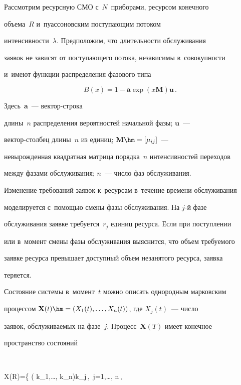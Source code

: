   


  Рассмотрим ресурсную СМО с~$N$~приборами, ресурсом конечного 


объема~$R$ и~пуассоновским поступающим потоком 


интенсивности~$\lambda$. Предположим, что длительности обслуживания 


заявок не зависят от поступающего потока, независимы в~совокупности 


и~имеют функции распределения фазового типа 


$$


B(x)= 1- \mathbf{a} 


\exp (x\mathbf{M})\mathbf{u}\,.


$$


 Здесь~$\mathbf{a}$~--- век\-тор-стро\-ка 


длины~$n$ распределения вероятностей начальной фазы; $\mathbf{u}$~---  


век\-тор-стол\-бец длины~$n$ из единиц; $\mathbf{M}\hm= [\mu_{ij}]$~--- 


не\-вы\-рож\-ден\-ная квад\-рат\-ная мат\-ри\-ца порядка~$n$ интенсивностей переходов 


между фазами обслуживания; $n$~--- чис\-ло фаз обслуживания.


  


  Изменение требований заявок к~ресурсам в~течение времени обслуживания 


моделируется с~помощью смены фазы обслуживания. На $j$-й фазе 


обслуживания заявке требуется~$r_j$ единиц ресурса. Если при поступлении 


или в~момент смены фазы обслуживания выяснится, что объем требуемого 


заявке ресурса превышает доступный объем незанятого ресурса, заявка 


теряется. 


  


  Состояние системы в~момент~$t$ можно описать однородным марковским 


процессом $\mathbf{X}(t)\hm= (X_1(t), \ldots , X_n(t))$, где $X_j(t)$~--- число 


заявок, обслуживаемых на фазе~$j$. Процесс~$\mathbf{X}(T)$   имеет конечное 


пространство состояний 


  $$


  {\sf X}(R)=\left\{ \left( k_1,\ldots , k_n\right)\vert k_j\,,\ j=1,\ldots , n\,,\ 


